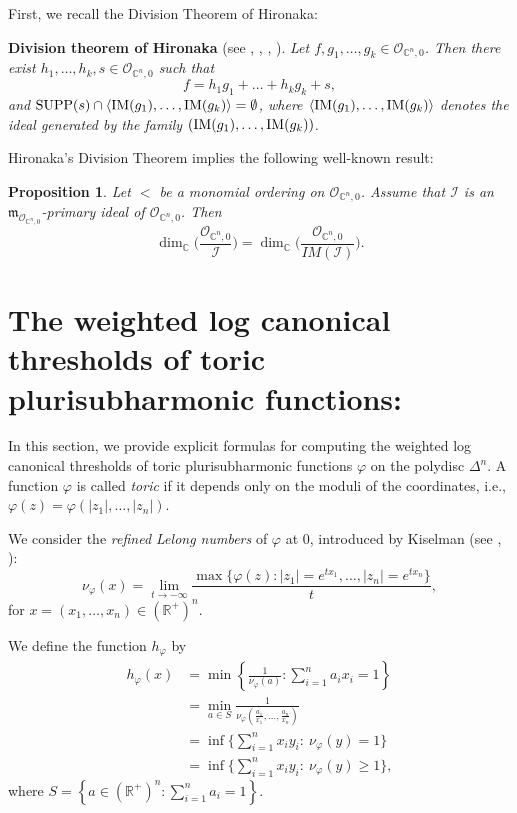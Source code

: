 \documentclass[a4paper,oneside,reqno,11pt]{article}
\newtheorem{proposition}[theorem]{Proposition}
\def\ul#1{{\smash{\rm#1}}}
\def\SUPP{\mathop{\ul{SUPP}}}
\def\IM{\mathop{\ul{IM}}}
\begin{document}
First, we recall the Division Theorem of Hironaka:

{\bf Division theorem of Hironaka} (see \cite{Ga79}, \cite{Ba82}, \cite{BM87}, \cite{Ei95}). {\it Let $f, g_1,\ldots,g_k\in {\mathcal O}_{\mathbb C^n,0}$. Then there exist $h_1,\ldots,h_k,s\in {\mathcal O}_{\mathbb C^n,0}$ such that
$$f=h_1g_1+\ldots+h_kg_k+s,$$
and $\SUPP(s)\cap \langle\IM(g_1),\ldots,\IM(g_k)\rangle =\emptyset$, where $\langle\IM(g_1),\ldots,\IM(g_k)\rangle$ denotes the ideal generated by the family $(\IM(g_1),\ldots,\IM(g_k))$.}

Hironaka's Division Theorem implies the following well-known result:

\begin{proposition}\label{dimension_ideal} Let $<$ be a monomial ordering on $\mathcal O_{ \mathbb C^n, 0}$. Assume that $\mathcal I$ is an $\mathfrak{m}_{ \mathcal O_{ \mathbb C^n, 0} }$-primary ideal of $\mathcal O_{ \mathbb C^n, 0}$. Then
$$\dim_{ \mathbb C } \big( \frac {\mathcal O_{ \mathbb C^n, 0} } { \mathcal I } \big) = \dim_{ \mathbb C } \big( \frac {\mathcal O_{ \mathbb C^n, 0} } { IM ( \mathcal I ) } \big).$$
\end{proposition}

\section{The weighted log canonical thresholds of toric plurisubharmonic functions:}

In this section, we provide explicit formulas for computing the weighted log canonical thresholds of toric plurisubharmonic functions $\varphi$ on the polydisc $\Delta^n$. A function $\varphi$ is called \emph{toric} if it depends only on the moduli of the coordinates, i.e., $\varphi(z) = \varphi(|z_1|, \ldots, |z_n|)$.

We consider the \emph{refined Lelong numbers} of $\varphi$ at $0$, introduced by Kiselman (see \cite{De93a}, \cite{Ki94}):
$$
\nu_{\varphi}(x) = \lim_{t \to -\infty} \frac{ \max\{ \varphi(z) : |z_1| = e^{t x_1}, \ldots, |z_n| = e^{t x_n} \} }{t},
$$
for $x = (x_1, \ldots, x_n) \in (\mathbb{R}^+)^n$.

We define the function $h_\varphi$ by
$$
\begin{aligned}
h_{\varphi}(x) &= \min\left\{ \frac{1}{\nu_{\varphi}(a)} : \sum_{i=1}^n a_i x_i = 1 \right\} \\
&= \min_{a \in S} \frac{1}{\nu_{\varphi} \left( \frac{a_1}{x_1}, \ldots, \frac{a_n}{x_n} \right)}\\
&= \inf \{ \sum\limits_{i=1}^n x_i y_i: \  \nu_{\varphi} ( y ) = 1\}\\
&= \inf \{ \sum\limits_{i=1}^n x_i y_i: \  \nu_{\varphi} ( y ) \geq 1\},
\end{aligned}
$$
where $S = \left\{ a \in (\mathbb{R}^+)^n : \sum_{i=1}^n a_i = 1 \right\}$.
\end{document}
